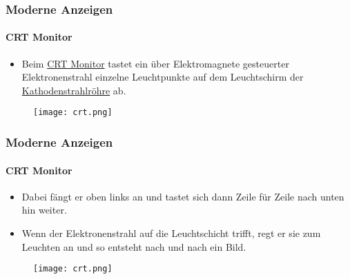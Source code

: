 \begin{frame}
    \frametitle{Moderne Anzeigen}
    \framesubtitle{CRT Monitor}
    \begin{minipage}{0.5\textwidth}
        \begin{itemize}
            \item Beim \href{https://de.wikipedia.org/wiki/Kathodenstrahlr\%C3\%B6hrenbildschirm}{CRT Monitor} tastet ein über Elektromagnete gesteuerter Elektronenstrahl einzelne Leuchtpunkte auf dem Leuchtschirm der \href{https://de.wikipedia.org/wiki/Kathodenstrahlr\%C3\%B6hre}{Kathodenstrahlröhre} ab.
        \end{itemize}
    \end{minipage} \hfill
    \begin{minipage}{0.45\textwidth}
        \begin{figure}
            \texttt{[image: crt.png]}
        \end{figure}
    \end{minipage}
\end{frame}

\begin{frame}
    \frametitle{Moderne Anzeigen}
    \framesubtitle{CRT Monitor}
    \begin{minipage}{0.5\textwidth}
        \begin{itemize}
            \item Dabei fängt er oben links an und tastet sich dann Zeile für Zeile nach unten hin weiter.
            \item Wenn der Elektronenstrahl auf die Leuchtschicht trifft, regt er sie zum Leuchten an und so entsteht nach und nach ein Bild.
        \end{itemize}
    \end{minipage} \hfill
    \begin{minipage}{0.45\textwidth}
        \begin{figure}
            \texttt{[image: crt.png]}
        \end{figure}
    \end{minipage}
\end{frame}

